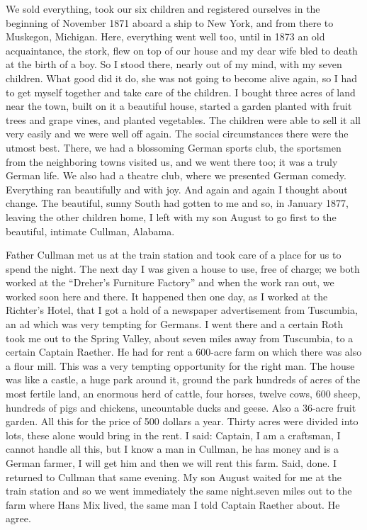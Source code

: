We sold everything, took our six children and registered ourselves in the beginning of November 1871 aboard a ship to New York, and from there to Muskegon, Michigan. Here, everything went well too, until in 1873 an old acquaintance, the stork, flew on top of our house and my dear wife bled to death at the birth of a boy. So I stood there, nearly out of my mind, with my seven children. What good did it do, she was not going to become alive again, so I had to get myself together and take care of the children. I bought three acres of land near the town, built on it a beautiful house, started a garden planted with fruit trees and grape vines, and planted vegetables. The children were able to sell it all very easily and we were well off again. The social circumstances there were the utmost best. There, we had a blossoming German sports club, the sportsmen from the neighboring towns visited us, and we went there too; it was a truly German life. We also had a theatre club, where we presented German comedy. Everything ran beautifully and with joy. And again and again I thought about change. The beautiful, sunny South had gotten to me and so, in January 1877, leaving the other children home, I left with my son August to go first to the beautiful, intimate Cullman, Alabama.

Father Cullman met us at the train station and took care of a place for us to spend the night. The next day I was given a house to use, free of charge; we both worked at the ``Dreher's Furniture Factory'' and when the work ran out, we worked soon here and there. It happened then one day, as I worked at the Richter's Hotel, that I got a hold of a newspaper advertisement from Tuscumbia, an ad which was very tempting for Germans. I went there and a certain Roth took me out to the Spring Valley, about seven miles away from Tuscumbia, to a certain Captain Raether. He had for rent a 600-acre farm on which there was also a flour mill. This was a very tempting opportunity for the right man. The house was like a castle, a huge park around it, ground the park hundreds of acres of the most fertile land, an enormous herd of cattle, four horses, twelve cows, 600 sheep, hundreds of pigs and chickens, uncountable ducks and geese. Also a 36-acre fruit garden. All this for the price of 500 dollars a year. Thirty acres were divided into lots, these alone would bring in the rent. I said: Captain, I am a craftsman, I cannot handle all this, but I know a man in Cullman, he has money and is a German farmer, I will get him and then we will rent this farm. Said, done. I returned to Cullman that same evening. My son August waited for me at the train station and so we went immediately the same night.seven miles out to the farm where Hans Mix lived, the same man I told Captain Raether about. He agree.

